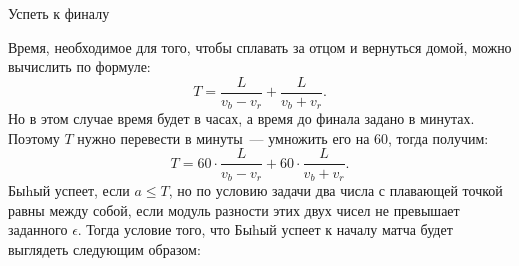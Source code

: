 \begin{tutorial}{Успеть к финалу}

Время, необходимое для того, чтобы сплавать за отцом и вернуться домой, можно вычислить по формуле:
$$T=\frac{L}{v_b-v_r} + \frac{L}{v_b+v_r}.$$
Но в этом случае время будет в часах, а время до финала задано в минутах. Поэтому $T$ нужно перевести в минуты~--- умножить его на $60$, тогда получим:
$$T=60 \cdot \frac{L}{v_b-v_r} + 60 \cdot \frac{L}{v_b+v_r}.$$
Быhый успеет, если $a\leq T$, но по условию задачи два числа с плавающей точкой равны между собой, если модуль разности этих двух чисел не превышает заданного $\epsilon$. Тогда условие того, что Быhый успеет к началу матча будет выглядеть следующим образом:


\end{tutorial}
